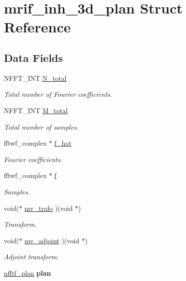 \hypertarget{structmrif__inh__3d__plan}{\section{mrif\-\_\-inh\-\_\-3d\-\_\-plan Struct Reference}
\label{structmrif__inh__3d__plan}
}
\subsection*{Data Fields}
\begin{DoxyCompactItemize}
\item 
N\-F\-F\-T\-\_\-\-I\-N\-T \hyperlink{structmrif__inh__3d__plan_a9ccd5c85ac960517ad0bf988174b263f}{N\-\_\-total}
\begin{DoxyCompactList}\small\item\em Total number of Fourier coefficients. \end{DoxyCompactList}\item 
N\-F\-F\-T\-\_\-\-I\-N\-T \hyperlink{structmrif__inh__3d__plan_a644e4dd77b345fc0c927dfa2edbc223a}{M\-\_\-total}
\begin{DoxyCompactList}\small\item\em Total number of samples. \end{DoxyCompactList}\item 
fftwf\-\_\-complex $\ast$ \hyperlink{structmrif__inh__3d__plan_ac644cb0bbceb7ea8634ea94758da405d}{f\-\_\-hat}
\begin{DoxyCompactList}\small\item\em Fourier coefficients. \end{DoxyCompactList}\item 
fftwf\-\_\-complex $\ast$ \hyperlink{structmrif__inh__3d__plan_aa762bd3f11d1558e792ff34dc710bcb3}{f}
\begin{DoxyCompactList}\small\item\em Samples. \end{DoxyCompactList}\item 
void($\ast$ \hyperlink{structmrif__inh__3d__plan_a4763b4f8f1b5f574d601289ab3cbcfa8}{mv\-\_\-trafo} )(void $\ast$)
\begin{DoxyCompactList}\small\item\em Transform. \end{DoxyCompactList}\item 
void($\ast$ \hyperlink{structmrif__inh__3d__plan_ac765b0a8797a3fd31b58133be9ff280b}{mv\-\_\-adjoint} )(void $\ast$)
\begin{DoxyCompactList}\small\item\em Adjoint transform. \end{DoxyCompactList}\item 
\hypertarget{structmrif__inh__3d__plan_a6c0f3d1e0a228a2484fdd9eeb3bdd0be}{\hyperlink{structnfftf__plan}{nfftf\-\_\-plan} {\bfseries plan}}\label{structmrif__inh__3d__plan_a6c0f3d1e0a228a2484fdd9eeb3bdd0be}


\end{DoxyCompactItemize}
